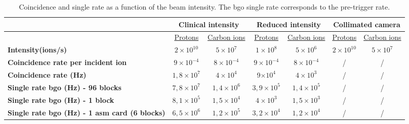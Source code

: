 \begin{table} [!htbp]
\centering
\caption{Coincidence and single rate as a function of the beam intensity. The \gls{bgo} single rate corresponds to the pre-trigger rate.}
\label{chapappA::tab::coincSingleRate}
\begin{tabular}{m{3.2cm} c c c c c c}
\toprule
\rowcolor{myColorMainA!20}
		& \multicolumn{2}{c}{\textbf{Clinical intensity}} &\multicolumn{2}{c}{\textbf{Reduced intensity}} &\multicolumn{2}{c}{ \textbf{Collimated camera}}\\
\midrule		
		& \underline{Protons}& \underline{Carbon ions} & \underline{Protons}& \underline{Carbon ions} &\underline{Protons}& \underline{Carbon ions} \\
\midrule
\textbf{Intensity(ions/s)}		& $2\times10^{10}$	&$5\times10^{7}$  & $1\times10^{8}$& $5\times10^{6}$ &$2\times10^{10}$& $5\times10^{7}$ \\
\textbf{Coincidence rate per incident ion}		& $9\times10^{-4}$&  $8\times10^{-4}$&  $9\times10^{-4}$& $8\times10^{-4}$& / &  / \\
\textbf{Coincidence rate (Hz)}		& $1,8\times10^{7}$&  $4\times10^{4}$&  9$\times10^{4}$& $4\times10^{3}$& / &  / \\
\textbf{Single rate \gls{bgo} (Hz) - 96 blocks}		& 	$7,8\times10^{7}$& $1,4\times10^{6}$ & $3,9\times10^{5}$&$1,4\times10^{5}$ &/&/\\
\textbf{Single rate \gls{bgo} (Hz) - 1 block}		& 	$8,1\times10^{5}$& $1,5\times10^{4}$ & $4\times10^{3}$&$1,5\times10^{3}$ &/&/\\
\textbf{Single rate \gls{bgo} (Hz) - 1 \gls{asm} card (6 blocks)}		& 	$6,5\times10^{6}$& $1,2\times10^{5}$ & $3,2\times10^{4}$&$1,2\times10^{4}$ &/&/\\
\bottomrule
\end{tabular}
\end{table}


